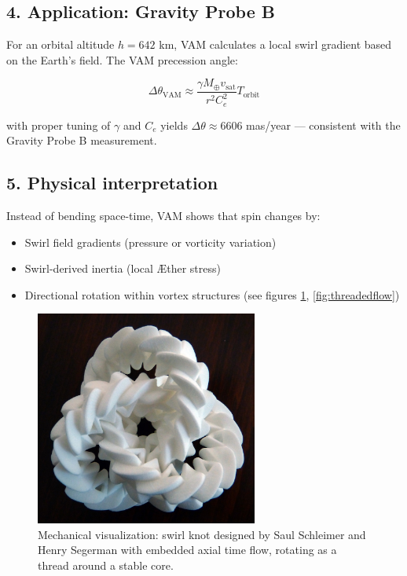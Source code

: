 \subsection*{4. Application: Gravity Probe B}
For an orbital altitude \( h = 642 \) km, VAM calculates a local swirl gradient based on the Earth's field. The VAM precession angle:

\[
\Delta\theta_\text{VAM} \approx \frac{\gamma M_{\oplus} v_\text{sat}}{r^2 C_e^2} T_\text{orbit}
\]

with proper tuning of \( \gamma \) and \( C_e \) yields \( \Delta\theta \approx 6606 \) mas/year — consistent with the Gravity Probe B measurement.

\subsection*{5. Physical interpretation}
Instead of bending space-time, VAM shows that spin changes by:
\begin{itemize}
\item Swirl field gradients (pressure or vorticity variation)
\item Swirl-derived inertia (local Æther stress)
\item Directional rotation within vortex structures (see figures \ref{fig:mechanicaltrefoil}, \ref{fig:threadedflow})
\end{itemize}

\begin{figure}[h!]
\centering
\includegraphics[width=0.65\textwidth]{images/mechanic_trefoil}
\caption{Mechanical visualization: swirl knot designed by Saul Schleimer and Henry Segerman
with embedded axial time flow, rotating as a thread around a stable core.}
\label{fig:mechanicaltrefoil}
\end{figure}

